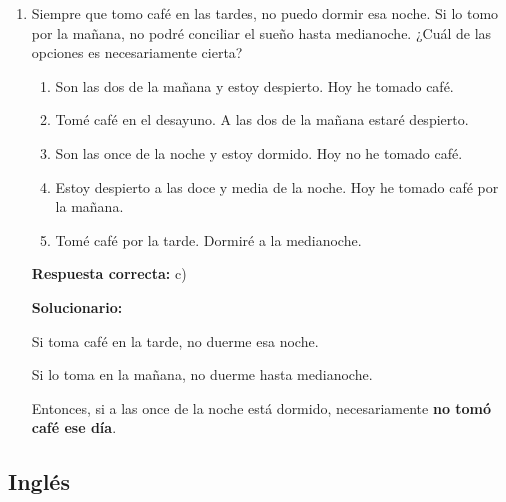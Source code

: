 \begin{enumerate}[resume]
	\vspace{2mm}
	\textbf{Solucionario:}
	
	Primero se presenta el tema general: II.
	
	Luego se amplía la variedad de las plantas: V.
	
	Después se señala su función principal: III.
	
	Finalmente se mencionan las condiciones para su desarrollo: I, y se precisa una de ellas: IV.
	
	Orden:
	
	II -- V -- III -- I -- IV
	
	\vspace{6mm}
	
	\item Siempre que tomo café en las tardes, no puedo dormir esa noche. Si lo tomo por la mañana, no podré conciliar el sueño hasta medianoche. ¿Cuál de las opciones es necesariamente cierta?
	\begin{enumerate}[label=\alph*)]
		\item Son las dos de la mañana y estoy despierto. Hoy he tomado café.
		\item Tomé café en el desayuno. A las dos de la mañana estaré despierto.
		\item Son las once de la noche y estoy dormido. Hoy no he tomado café.
		\item Estoy despierto a las doce y media de la noche. Hoy he tomado café por la mañana.
		\item Tomé café por la tarde. Dormiré a la medianoche.
	\end{enumerate}
	\textbf{Respuesta correcta:} c)
	
	\vspace{2mm}
	\textbf{Solucionario:}
	
	Si toma café en la tarde, no duerme esa noche.
	
	Si lo toma en la mañana, no duerme hasta medianoche.
	
	Entonces, si a las once de la noche está dormido, necesariamente \textbf{no tomó café ese día}.
	
	\vspace{6mm}
\end{enumerate}

\subsection*{Inglés}

